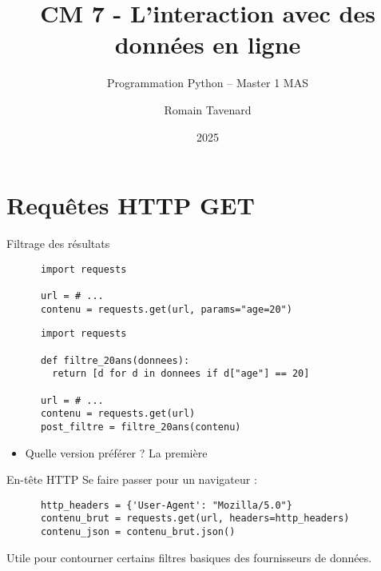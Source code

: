 \documentclass[10pt]{beamer}
\title[M1 MAS -- Python -- Fichiers]{CM 7 - L'interaction avec des données en ligne}
\subtitle{Programmation Python -- Master 1 MAS}
\author{Romain Tavenard}
\date{2025}
\institute{%
\hypersetup{urlcolor=.}
\makebox[2.2ex][c]{\faEnvelope}\enspace\href{mailto:romain.tavenard@univ-rennes2.fr}{\texttt{romain.tavenard@univ-rennes2.fr}}\\%
}
\begin{document}
\maketitle

\section{Requêtes HTTP GET}

\begin{frame}[fragile]{Filtrage des résultats}


  \begin{beamercodeblock}
    \begin{verbatim}
      import requests

      url = # ...
      contenu = requests.get(url, params="age=20")
    \end{verbatim}
  \end{beamercodeblock}

  \begin{beamercodeblock}
    \begin{verbatim}
      import requests

      def filtre_20ans(donnees):
        return [d for d in donnees if d["age"] == 20]

      url = # ...
      contenu = requests.get(url)
      post_filtre = filtre_20ans(contenu)
    \end{verbatim}
  \end{beamercodeblock} 

  \begin{itemize}
    \item Quelle version préférer ? \pause \alert{La première}
  \end{itemize}

\end{frame}

\begin{frame}[fragile]{En-tête HTTP}
  Se faire passer pour un navigateur :
  \begin{beamercodeblock}
    \begin{verbatim}
      http_headers = {'User-Agent': "Mozilla/5.0"}
      contenu_brut = requests.get(url, headers=http_headers)
      contenu_json = contenu_brut.json()
    \end{verbatim}
  \end{beamercodeblock}

  Utile pour contourner certains filtres basiques des fournisseurs de données.
\end{frame}
\end{document}
